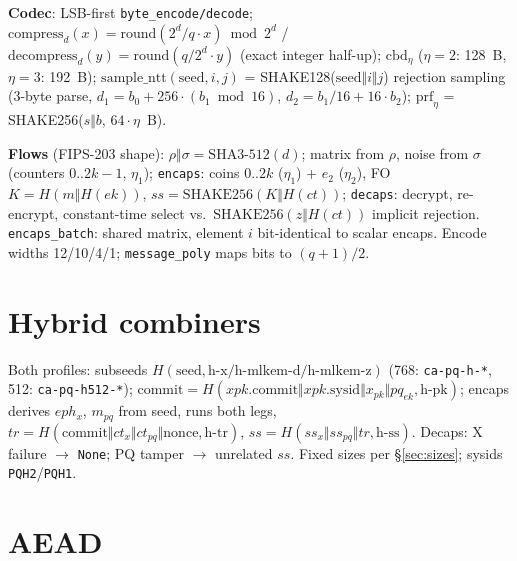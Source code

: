 \documentclass[11pt,a4paper]{article}
\begin{document}
\textbf{Codec}: LSB-first \texttt{byte\_encode/decode};
$\mathrm{compress}_d(x) = \mathrm{round}(2^d/q \cdot x) \bmod 2^d$ /
$\mathrm{decompress}_d(y) = \mathrm{round}(q/2^d \cdot y)$ (exact integer half-up);
$\mathrm{cbd}_\eta$ ($\eta = 2$: 128~B, $\eta = 3$: 192~B);
$\mathrm{sample\_ntt}(\mathrm{seed}, i, j)$ = SHAKE128($\mathrm{seed} \Vert i \Vert j$)
rejection sampling (3-byte parse, $d_1 = b_0 + 256\cdot(b_1 \bmod 16)$,
$d_2 = b_1/16 + 16\cdot b_2$); $\mathrm{prf}_\eta$ = SHAKE256($s \Vert b$,
$64\cdot\eta$~B).

\textbf{Flows} (FIPS-203 shape): $\rho \Vert \sigma = \mathrm{SHA3\text{-}512}(d)$;
matrix from $\rho$, noise from $\sigma$ (counters $0..2k{-}1$, $\eta_1$);
\texttt{encaps}: coins $0..2k$ ($\eta_1$) + $e_2$ ($\eta_2$), FO
$K = H(m \Vert H(ek))$, $\mathit{ss} = \mathrm{SHAKE256}(K \Vert H(ct))$;
\texttt{decaps}: decrypt, re-encrypt, constant-time select vs.\
$\mathrm{SHAKE256}(z \Vert H(ct))$ implicit rejection.
\texttt{encaps\_batch}: shared matrix, element $i$ bit-identical to scalar
encaps. Encode widths 12/10/4/1; \texttt{message\_poly} maps bits to $(q+1)/2$.

\section{Hybrid combiners}
\label{sec:hybrid}

Both profiles: subseeds $H(\mathrm{seed}, \text{h-x} / \text{h-mlkem-d} /
\text{h-mlkem-z})$ (768: \texttt{ca-pq-h-*}, 512: \texttt{ca-pq-h512-*});
$\mathrm{commit} = H(xpk.\mathrm{commit} \Vert xpk.\mathrm{sysid} \Vert x_{pk}
\Vert pq_{ek}, \text{h-pk})$; encaps derives $eph_x$, $m_{pq}$ from seed, runs
both legs, $tr = H(\mathrm{commit} \Vert \mathit{ct}_x \Vert \mathit{ct}_{pq}
\Vert \mathrm{nonce}, \text{h-tr})$,
$\mathit{ss} = H(\mathit{ss}_x \Vert \mathit{ss}_{pq} \Vert tr, \text{h-ss})$.
Decaps: X failure $\to$ \texttt{None}; PQ tamper $\to$ unrelated $\mathit{ss}$.
Fixed sizes per \S\ref{sec:sizes}; sysids \texttt{PQH2}/\texttt{PQH1}.

\section{AEAD}
\label{sec:aead}
\end{document}
